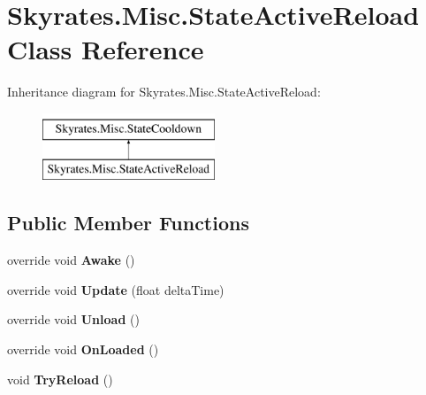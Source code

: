 \hypertarget{class_skyrates_1_1_misc_1_1_state_active_reload}{\section{Skyrates.\-Misc.\-State\-Active\-Reload Class Reference}
\label{class_skyrates_1_1_misc_1_1_state_active_reload}
}
Inheritance diagram for Skyrates.\-Misc.\-State\-Active\-Reload\-:\begin{figure}[H]
\begin{center}
\leavevmode
\includegraphics[height=2.000000cm]{class_skyrates_1_1_misc_1_1_state_active_reload}
\end{center}
\end{figure}
\subsection*{Public Member Functions}
\begin{DoxyCompactItemize}
\item 
\hypertarget{class_skyrates_1_1_misc_1_1_state_active_reload_a597feb9e4e50a6a220a18ff26e3a83c7}{override void {\bfseries Awake} ()}\label{class_skyrates_1_1_misc_1_1_state_active_reload_a597feb9e4e50a6a220a18ff26e3a83c7}

\item 
\hypertarget{class_skyrates_1_1_misc_1_1_state_active_reload_af050602d0e15132dbb5ac6f9bb931313}{override void {\bfseries Update} (float delta\-Time)}\label{class_skyrates_1_1_misc_1_1_state_active_reload_af050602d0e15132dbb5ac6f9bb931313}

\item 
\hypertarget{class_skyrates_1_1_misc_1_1_state_active_reload_a1ed201c327cc97fe84debddf324127d6}{override void {\bfseries Unload} ()}\label{class_skyrates_1_1_misc_1_1_state_active_reload_a1ed201c327cc97fe84debddf324127d6}

\item 
\hypertarget{class_skyrates_1_1_misc_1_1_state_active_reload_a1eb782166f79982b262104a7f79e1521}{override void {\bfseries On\-Loaded} ()}\label{class_skyrates_1_1_misc_1_1_state_active_reload_a1eb782166f79982b262104a7f79e1521}

\item 
\hypertarget{class_skyrates_1_1_misc_1_1_state_active_reload_ae7fdc2a08957bb4464dba6358dfb6528}{void {\bfseries Try\-Reload} ()}\label{class_skyrates_1_1_misc_1_1_state_active_reload_ae7fdc2a08957bb4464dba6358dfb6528}

\end{DoxyCompactItemize}

